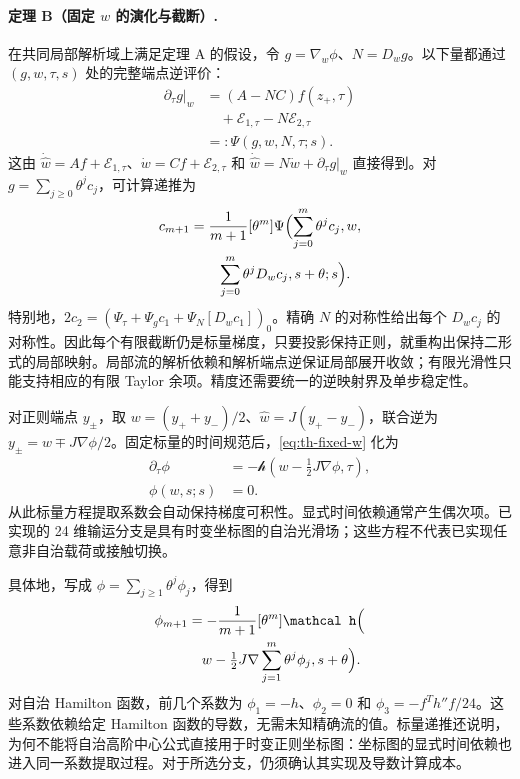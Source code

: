\paragraph{定理 B（固定 $w$ 的演化与截断）.}\label{thm:fixed-w}
在共同局部解析域上满足定理 A 的假设，令 $g=\nabla_w\phi$、$N=D_wg$。以下量都通过 $(g,w,\tau,s)$ 处的完整端点逆评价：
\begin{equation}
 \begin{aligned}
 \left.\partial_\tau g\right|_w
 &=(A-NC)f(z_+,\tau)\\
 &\quad+\mathcal E_{1,\tau}-N\mathcal E_{2,\tau}\\
 &=:\Psi(g,w,N,\tau;s).
\end{aligned}
 \label{eq:th-fixed-w}
\end{equation}
这由 $\dot{\widehat w}=A f+\mathcal E_{1,\tau}$、$\dot w=Cf+\mathcal E_{2,\tau}$ 和 $\dot{\widehat w}=N\dot w+\partial_\tau g|_w$ 直接得到。对 $g=\sum_{j\ge0}\theta^jc_j$，可计算递推为
\begin{equation}
 \begin{aligned}
 c_{m+1}&=\frac1{m+1}[\theta^m]\Psi\Bigl(
 \sum_{j=0}^m\theta^jc_j,w,\\
 &\hspace{2em}\sum_{j=0}^m\theta^jD_wc_j,s+\theta;s\Bigr).
\end{aligned}
 \label{eq:th-fixed-recursion}
\end{equation}
特别地，$2c_2=(\Psi_\tau+\Psi_g c_1+\Psi_N[D_wc_1])_0$。精确 $N$ 的对称性给出每个 $D_wc_j$ 的对称性。因此每个有限截断仍是标量梯度，只要投影保持正则，就重构出保持二形式的局部映射。局部流的解析依赖和解析端点逆保证局部展开收敛；有限光滑性只能支持相应的有限 Taylor 余项。精度还需要统一的逆映射界及单步稳定性。

对正则端点 $y_\pm$，取 $w=(y_++y_-)/2$、$\widehat w=J(y_+-y_-)$，联合逆为 $y_\pm=w\mp J\nabla\phi/2$。固定标量的时间规范后，\eqref{eq:th-fixed-w} 化为
\begin{equation}
 \begin{aligned}
 \partial_\tau\phi&=-\mathcal h\left(w-\tfrac12J\nabla\phi,\tau\right),\\
 \phi(w,s;s)&=0.
\end{aligned}
 \label{eq:th-central-pde}
\end{equation}
从此标量方程提取系数会自动保持梯度可积性。显式时间依赖通常产生偶次项。已实现的 24 维输运分支是具有时变坐标图的自治光滑场；这些方程不代表已实现任意非自治载荷或接触切换。

具体地，写成 $\phi=\sum_{j\ge1}\theta^j\phi_j$，得到
\begin{equation}
 \begin{aligned}
 \phi_{m+1}&=-\frac1{m+1}[\theta^m]\mathcal h\Bigl(\\
 &\quad w-\tfrac12J\nabla\sum_{j=1}^{m}\theta^j\phi_j,s+\theta\Bigr).
\end{aligned}
 \label{eq:th-scalar-recursion}
\end{equation}
对自治 Hamilton 函数，前几个系数为 $\phi_1=-h$、$\phi_2=0$ 和 $\phi_3=-f^Th''f/24$。这些系数依赖给定 Hamilton 函数的导数，无需未知精确流的值。标量递推还说明，为何不能将自治高阶中心公式直接用于时变正则坐标图：坐标图的显式时间依赖也进入同一系数提取过程。对于所选分支，仍须确认其实现及导数计算成本。

